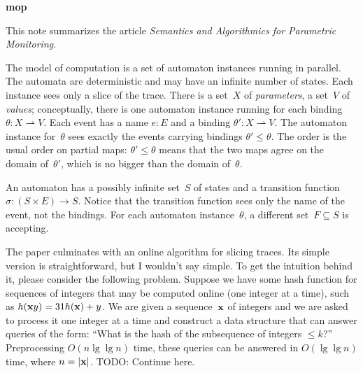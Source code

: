\def\pmap{\rightharpoonup}
\centerline{\bf mop}

\medskip\noindent This note summarizes the article {\it Semantics and Algorithmics for Parametric Monitoring\/}.
\medskip

The model of computation is a set of automaton instances running in parallel.
The automata are deterministic and may have an infinite number of states.
Each instance sees only a slice of the trace.
There is a set~$X$ of {\it parameters\/}, a set~$V$ of {\it values\/}; conceptually, there is one automaton instance running for each binding $\theta:X\pmap V$.
Each event has a name $e : E$ and a binding $\theta':X\pmap V$.
The automaton instance for~$\theta$ sees exactly the events carrying bindings $\theta'\le\theta$.
The order is the usual order on partial maps:
$\theta'\le\theta$ means that the two maps agree on the domain of~$\theta'$, which is no bigger than the domain of~$\theta$.

An automaton has a possibly infinite set~$S$ of states and a transition function $\sigma:(S\times E)\to S$.
Notice that the transition function sees only the name of the event, not the bindings.
For each automaton instance~$\theta$, a different set~$F\subseteq S$ is accepting.

The paper culminates with an online algorithm for slicing traces.
Its simple version is straightforward, but I wouldn't say simple.
To get the intuition behind it, please consider the following problem.
Suppose we have some hash function for sequences of integers that may be computed online (one integer at a time), such as $h({\bf x}y)=31h({\bf x})+y$.
We are given a sequence~${\bf x}$ of integers and we are asked to process it one integer at a time and construct a data structure that can answer queries of the form:
``What is the hash of the subsequence of integers $\le k$?''
Preprocessing $O(n\lg\lg n)$ time, these queries can be answered in $O(\lg\lg n)$ time, where $n=|{\bf x}|$.
TODO: Continue here.

\bye
